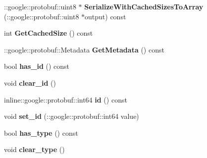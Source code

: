 \begin{DoxyCompactItemize}
\item 
\hypertarget{classexercise__protobuf_1_1_equipment_a01b12466e3bca65be96dfe1137c11678}{}\+::google\+::protobuf\+::uint8 $\ast$ {\bfseries Serialize\+With\+Cached\+Sizes\+To\+Array} (\+::google\+::protobuf\+::uint8 $\ast$output) const \label{classexercise__protobuf_1_1_equipment_a01b12466e3bca65be96dfe1137c11678}

\item 
\hypertarget{classexercise__protobuf_1_1_equipment_af54af5e38428b24a8094c9e86218be83}{}int {\bfseries Get\+Cached\+Size} () const \label{classexercise__protobuf_1_1_equipment_af54af5e38428b24a8094c9e86218be83}

\item 
\hypertarget{classexercise__protobuf_1_1_equipment_a7594133c99cde742d22d00c4854833da}{}\+::google\+::protobuf\+::\+Metadata {\bfseries Get\+Metadata} () const \label{classexercise__protobuf_1_1_equipment_a7594133c99cde742d22d00c4854833da}

\item 
\hypertarget{classexercise__protobuf_1_1_equipment_ad6e3390388ee6ace059a8f5e9a76aff1}{}bool {\bfseries has\+\_\+id} () const \label{classexercise__protobuf_1_1_equipment_ad6e3390388ee6ace059a8f5e9a76aff1}

\item 
\hypertarget{classexercise__protobuf_1_1_equipment_aa020e32b0f5ce92f65acc5d60905cd26}{}void {\bfseries clear\+\_\+id} ()\label{classexercise__protobuf_1_1_equipment_aa020e32b0f5ce92f65acc5d60905cd26}

\item 
\hypertarget{classexercise__protobuf_1_1_equipment_a20d626b7d989666caa167d47dd5b1be3}{}inline\+::google\+::protobuf\+::int64 {\bfseries id} () const \label{classexercise__protobuf_1_1_equipment_a20d626b7d989666caa167d47dd5b1be3}

\item 
\hypertarget{classexercise__protobuf_1_1_equipment_a8e9ae9cbd455231e3d7b9273f6b8a6ec}{}void {\bfseries set\+\_\+id} (\+::google\+::protobuf\+::int64 value)\label{classexercise__protobuf_1_1_equipment_a8e9ae9cbd455231e3d7b9273f6b8a6ec}

\item 
\hypertarget{classexercise__protobuf_1_1_equipment_a0dcc73af1c1261c194df9d3635df4228}{}bool {\bfseries has\+\_\+type} () const \label{classexercise__protobuf_1_1_equipment_a0dcc73af1c1261c194df9d3635df4228}

\item 
\hypertarget{classexercise__protobuf_1_1_equipment_a2d631bc102d777cc06b3db458461ad65}{}void {\bfseries clear\+\_\+type} ()\label{classexercise__protobuf_1_1_equipment_a2d631bc102d777cc06b3db458461ad65}


\end{DoxyCompactItemize}
